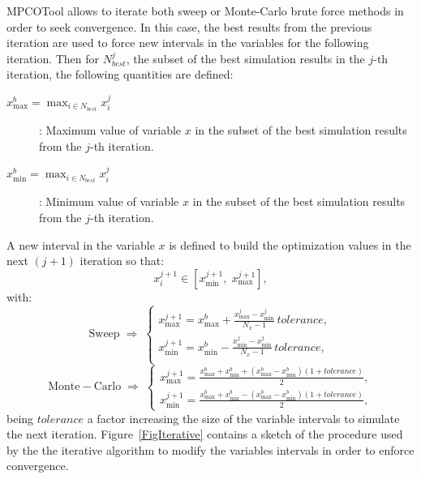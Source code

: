 \documentclass[a4paper]{report}
\newcommand{\EQ}[2]
{\begin{equation}#1\label{#2}\end{equation}}
\begin{document}
MPCOTool allows to iterate both sweep or Monte-Carlo brute force methods in
order to seek convergence. In this case, the best results from the previous
iteration are used to force new intervals in the variables for the following
iteration. Then for $N_{best}^j$, the subset of the best simulation results in
the $j$-th iteration, the following quantities are defined:
\begin{description}
\item[$\displaystyle x_{\max}^b=\max_{i\in N_{best}}x_i^j$]: Maximum value of
	variable $x$ in the subset of the best simulation results from the $j$-th
	iteration.
\item[$\displaystyle x_{\min}^b=\max_{i\in N_{best}}x_i^j$]: Minimum value of
	variable $x$ in the subset of the best simulation results from the $j$-th
	iteration.
\end{description}
A new interval in the variable $x$ is defined to build the optimization values in the next $(j+1)$ iteration so that:
\EQ{x_i^{j+1}\in\left[x_{\min}^{j+1},\;x_{\max}^{j+1}\right],}
{EqIterationInterval}
with:
\[
	\mathrm{Sweep}\;\Rightarrow\;\left\{\begin{array}{c}
	\displaystyle
	x_{\max}^{j+1}=x_{\max}^b+\frac{x_{\max}^j-x_{\min}^j}{N_x-1}\,tolerance,\\
	\displaystyle
	x_{\min}^{j+1}=x_{\min}^b-\frac{x_{\min}^j-x_{\min}^j}{N_x-1}\,tolerance,\\
	\end{array}\right.
\]
\EQ
{
	\mathrm{Monte-Carlo}\;\Rightarrow\;\left\{\begin{array}{c}
	\displaystyle x_{\max}^{j+1}=\frac{x_{\max}^b+x_{\min}^b
	+\left(x_{\max}^b-x_{\min}^b\right)(1+tolerance)}{2},\\
	\displaystyle x_{\min}^{j+1}=\frac{x_{\max}^b+x_{\min}^b
	-\left(x_{\max}^b-x_{\min}^b\right)(1+tolerance)}{2},
	\end{array}\right.
}{EqIterationIntervalII}
being $tolerance$ a factor increasing the size of the variable intervals to
simulate the next iteration.
Figure~\ref{FigIterative} contains a sketch of the procedure used by the the iterative algorithm to modify the variables intervals in order to enforce convergence. 
\end{document}
